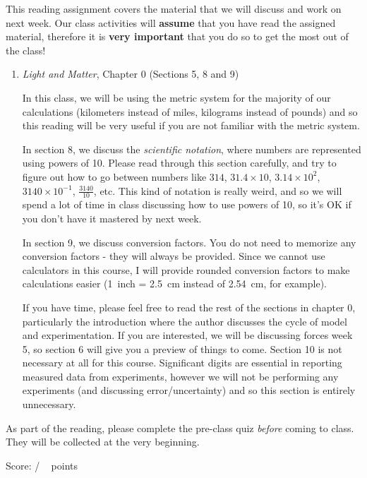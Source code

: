 \documentclass[addpoints,12pt]{exam}
\begin{document}
This reading assignment covers the material that we will discuss and work on next week. Our class activities will \textbf{assume} that you have read the assigned material, therefore it is \textbf{very important} that you do so to get the most out of the class!
\begin{enumerate}
	\item \textit{Light and Matter}, Chapter 0 (Sections 5, 8 and 9)
	
	In this class, we will be using the metric system for the majority of our calculations (kilometers instead of miles, kilograms instead of pounds) and so this reading will be very useful if you are not familiar with the metric system.
	
	In section 8, we discuss the \textit{scientific notation}, where numbers are represented using powers of 10. Please read through this section carefully, and try to figure out how to go between numbers like $314$, $31.4\times 10$, $3.14\times 10^2$, $3140\times 10^{-1}$, $\frac{3140}{10}$, etc. This kind of notation is really weird, and so we will spend  a lot of time in class discussing how to use powers of 10, so it's OK if you don't have it mastered by next week.
	
	In section 9, we discuss conversion factors. You do not need to memorize any conversion factors - they will always be provided. Since we cannot use calculators in this course, I will provide rounded conversion factors to make calculations easier (1~inch = 2.5~cm instead of 2.54~cm, for example).
	
	If you have time, please feel free to read the rest of the sections in chapter 0, particularly the introduction where the author discusses the cycle of model and experimentation. If you are interested, we will be discussing forces week 5, so section 6 will give you a preview of things to come. Section 10 is not necessary at all for this course. Significant digits are essential in reporting measured data from experiments, however we will not be performing any experiments (and discussing error/uncertainty) and so this section is entirely unnecessary.
	
	
\end{enumerate}

As part of the reading, please complete the pre-class quiz \textit{before} coming to class. They will be collected at the very beginning.
 
\clearpage

\begin{flushright}
Score: \hspace{0.2in} / \numpoints ~ points
\end{flushright}
\end{document}
